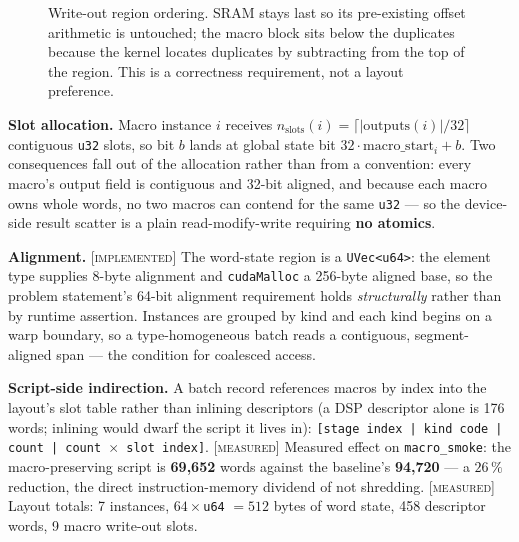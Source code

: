 \documentclass[11pt]{article}
\newcommand{\M}{\textcolor{blue!45!black}{\scriptsize\textsc{[measured]}}}
\newcommand{\I}{\textcolor{note}{\scriptsize\textsc{[implemented]}}}
\newcommand{\code}[1]{\texttt{\small #1}}
\begin{document}
\begin{figure}[h]\centering
{}
\caption{Write-out region ordering. SRAM stays last so its pre-existing offset
arithmetic is untouched; the macro block sits below the duplicates because the kernel
locates duplicates by subtracting from the top of the region. This is a correctness
requirement, not a layout preference.}
\label{fig:order}
\end{figure}

\textbf{Slot allocation.} Macro instance $i$ receives
$n_{\mathrm{slots}}(i) = \lceil |\mathrm{outputs}(i)| / 32 \rceil$ contiguous
\code{u32} slots, so bit $b$ lands at global state bit
$32\cdot \mathrm{macro\_start}_i + b$. Two consequences fall out of the allocation
rather than from a convention: every macro's output field is contiguous and 32-bit
aligned, and because each macro owns whole words, no two macros can contend for the
same \code{u32} --- so the device-side result scatter is a plain read-modify-write
requiring \textbf{no atomics}.

\textbf{Alignment.} \I{} The word-state region is a \code{UVec<u64>}: the element type
supplies 8-byte alignment and \code{cudaMalloc} a 256-byte aligned base, so the
problem statement's 64-bit alignment requirement holds \emph{structurally} rather
than by runtime assertion. Instances are grouped by kind and each kind begins on a
warp boundary, so a type-homogeneous batch reads a contiguous, segment-aligned span
--- the condition for coalesced access.

\textbf{Script-side indirection.} A batch record references macros by index into the
layout's slot table rather than inlining descriptors (a DSP descriptor alone is 176
words; inlining would dwarf the script it lives in): \code{[stage index | kind code |
count | count $\times$ slot index]}. \M{} Measured effect on \code{macro\_smoke}: the
macro-preserving script is \textbf{69,652} words against the baseline's
\textbf{94,720} --- a $26\,\%$ reduction, the direct instruction-memory dividend of
not shredding. \M{} Layout totals: 7 instances, $64\times$\code{u64} $=512$ bytes of
word state, 458 descriptor words, 9 macro write-out slots.
\end{document}

